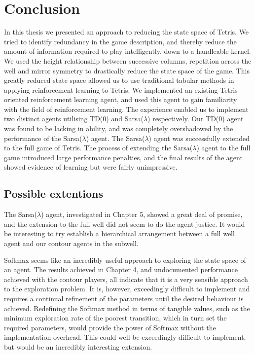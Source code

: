 \documentclass{rucsthesis}
\begin{document}
\chapter{Conclusion}

In this thesis we presented an approach to reducing the state space of Tetris. We tried to identify redundancy in the game description, and thereby reduce the amount of information required to play intelligently, down to a handleable kernel. We used the height relationship between successive columns, repetition across the well and mirror symmetry to drastically reduce the state space of the game. This greatly reduced state space allowed us to use traditional tabular methods in applying reinforcement learning to Tetris. We implemented an existing Tetris oriented reinforcement learning agent, and used this agent to gain familiarity with the field of reinforcement learning. The experience enabled us to implement two distinct agents utilising TD(0) and Sarsa($\lambda$) respectively. Our TD(0) agent was found to be lacking in ability, and was completely overshadowed by the performance of the Sarsa($\lambda$) agent. The Sarsa($\lambda$) agent was successfully extended to the full game of Tetris. The process of extending the Sarsa($\lambda$) agent to the full game introduced large performance penalties, and the final results of the agent showed evidence of learning but were fairly unimpressive. 

\section{Possible extentions}

The Sarsa($\lambda$) agent, investigated in Chapter 5, showed a great deal of promise, and the extension to the full well did not seem to do the agent justice. It would be interesting to try establish a hierarchical arrangement between a full well agent and our contour agents in the subwell.

Softmax seems like an incredibly useful approach to exploring the state space of an agent. The results achieved in Chapter 4, and undocumented performance achieved with the contour players, all indicate that it is a very sensible approach to the exploration problem. It is, however, exceedingly difficult to implement and requires a continual refinement of the parameters until the desired behaviour is achieved. Redefining the Softmax method in terms of tangible values, such as the minimum exploration rate of the poorest transition, which in turn set the required parameters, would provide the power of Softmax without the implementation overhead. This could well be exceedingly difficult to implement, but would be an incredibly interesting extension.


\end{document}

